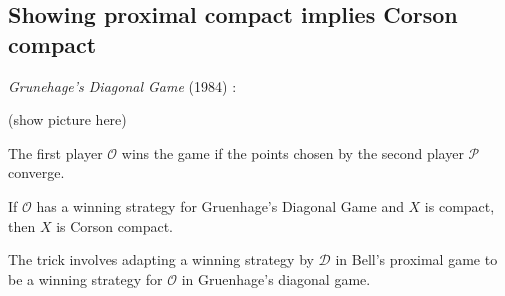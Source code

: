 \documentclass{beamer}
\theoremstyle{definition}
\newcommand{\<}{\langle}
\renewcommand{\>}{\rangle}
\newcommand{\pl}[1]{\mathscr{#1}}
\newcommand{\term}{\textit}
\begin{document}
\subsection{Showing proximal compact implies Corson compact}

\begin{frame}

  \term{Grunehage's Diagonal Game} (1984) \cite{MR752278}:

  \vspacing

  (show picture here)

  \vpause

  The first player $\pl O$ wins the game if the points chosen by the
  second player $\pl P$ converge.

  \begin{theorem}
    If $\pl O$ has a winning strategy for Gruenhage's Diagonal Game
    and $X$ is compact, then $X$ is Corson compact.
  \end{theorem}
\end{frame}

\begin{frame}
  The trick involves adapting a winning strategy by $\pl D$ in Bell's proximal
  game to be a winning strategy for $\pl O$ in Gruenhage's diagonal game.


\end{frame}


\begin{frame}
  \tiny
  
  
\end{frame}
\end{document}

